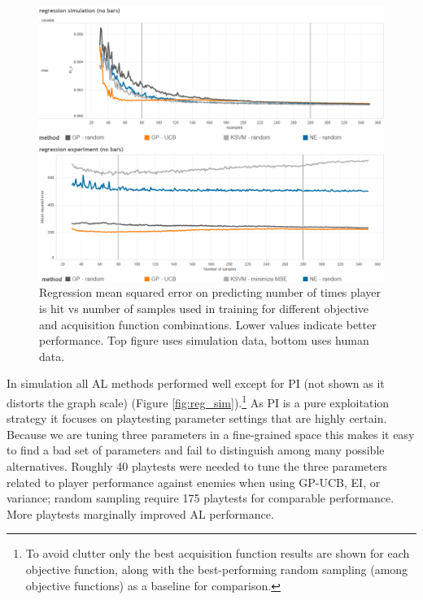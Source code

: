 \documentclass{sig-alternate}
\begin{document}
\begin{figure}[tb]
\centering
\includegraphics[width=\linewidth]{regression_results}
\caption{Regression mean squared error on predicting number of times player is hit vs number of samples used in training for different objective and acquisition function combinations. Lower values indicate better performance. Top figure uses simulation data, bottom uses human data.}
\label{fig:reg_all}
\end{figure}


In simulation all AL methods performed well except for PI (not shown as it distorts the graph scale) (Figure \ref{fig:reg_sim}).\footnote{To avoid clutter only the best acquisition function results are shown for each objective function, along with the best-performing random sampling (among objective functions) as a baseline for comparison.}
As PI is a pure exploitation strategy it focuses on playtesting parameter settings that are highly certain.
Because we are tuning three parameters in a fine-grained space this makes it easy to find a bad set of parameters and fail to distinguish among many possible alternatives.
%
%
Roughly 40 playtests were needed to tune the three parameters related to player performance against enemies when using GP-UCB, EI, or variance; random sampling require 175 playtests for comparable performance.
More playtests marginally improved AL performance.
\end{document}
